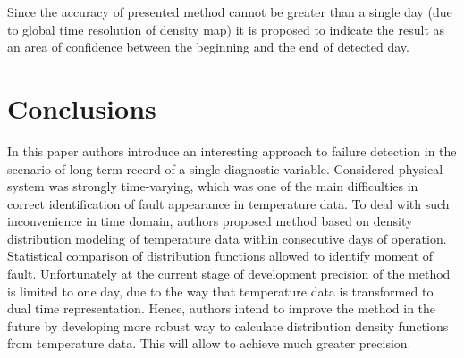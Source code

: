 \documentclass{svproc}
\begin{document}
Since the accuracy of presented method cannot be greater than a single day (due to global time resolution of density map) it is proposed to indicate the result as an area of confidence between the beginning and the end of detected day.

\section{Conclusions}

In this paper authors introduce an interesting approach to failure detection in the scenario of long-term record of a single diagnostic variable. Considered physical system was strongly time-varying, which was one of the main difficulties in correct identification of fault appearance in temperature data. To deal with such inconvenience in time domain, authors proposed method based on density distribution modeling of temperature data within consecutive days of operation. Statistical comparison of distribution functions allowed to identify moment of fault. Unfortunately at the current stage of development precision of the method is limited to one day, due to the way that temperature data is transformed to dual time representation. Hence, authors intend to improve the method in the future by developing more robust way to calculate distribution density functions from temperature data. This will allow to achieve much greater precision.


\end{document}
